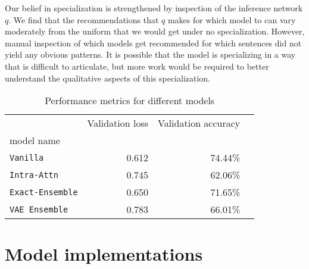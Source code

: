 \documentclass[12pt]{article}
\begin{document}
Our belief in specialization is strengthened by inspection of the inference
network $q$. We find that the recommendations that $q$ makes for which model to
can vary moderately from the uniform that we would get under no specialization.
However, manual inspection of which models get recommended for which sentences
did not yield any obvious patterns. It is possible that the model is
specializing in a way that is difficult to articulate, but more work would be
required to better understand the qualitative aspects of this specialization. 

\begin{landscape}

\begin{table}[h]
\centering
\begin{tabular}{lrrr}
\toprule
{}                                     & Validation loss & Validation accuracy \\
model name                             &       &        & \\
\midrule
\texttt{Vanilla}                      & 0.612  & 74.44\% \\
\texttt{Intra-Attn}  & 0.745   & 62.06\% \\
\texttt{Exact-Ensemble}  & 0.650   & 71.65\% \\
\texttt{VAE Ensemble} & 0.783 & 66.01\% \\
\bottomrule
\end{tabular}
\caption{Performance metrics for different models}
\label{table:performance}
\end{table}
\end{landscape}




\appendix
\section{Model implementations}






\end{document}
